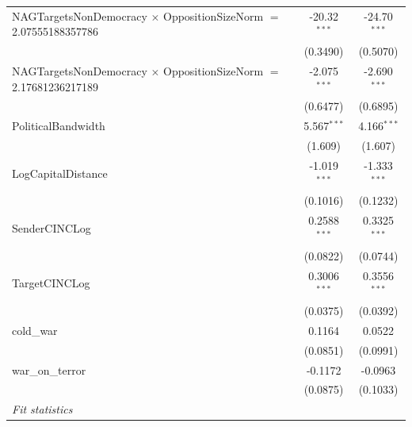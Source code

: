 \begin{tabular}{lcc}
   NAGTargetsNonDemocracy $\times$ OppositionSizeNorm $=$ 2.07555188357786      & -20.32$^{***}$       & -24.70$^{***}$\\   
                                                                                & (0.3490)             & (0.5070)\\   
   NAGTargetsNonDemocracy $\times$ OppositionSizeNorm $=$ 2.17681236217189      & -2.075$^{***}$       & -2.690$^{***}$\\   
                                                                                & (0.6477)             & (0.6895)\\   
   PoliticalBandwidth                                                           & 5.567$^{***}$        & 4.166$^{***}$\\   
                                                                                & (1.609)              & (1.607)\\   
   LogCapitalDistance                                                           & -1.019$^{***}$       & -1.333$^{***}$\\   
                                                                                & (0.1016)             & (0.1232)\\   
   SenderCINCLog                                                                & 0.2588$^{***}$       & 0.3325$^{***}$\\   
                                                                                & (0.0822)             & (0.0744)\\   
   TargetCINCLog                                                                & 0.3006$^{***}$       & 0.3556$^{***}$\\   
                                                                                & (0.0375)             & (0.0392)\\   
   cold\_war                                                                    & 0.1164               & 0.0522\\   
                                                                                & (0.0851)             & (0.0991)\\   
   war\_on\_terror                                                              & -0.1172              & -0.0963\\   
                                                                                & (0.0875)             & (0.1033)\\   
   \midrule
   \emph{Fit statistics}\\

\end{tabular}
